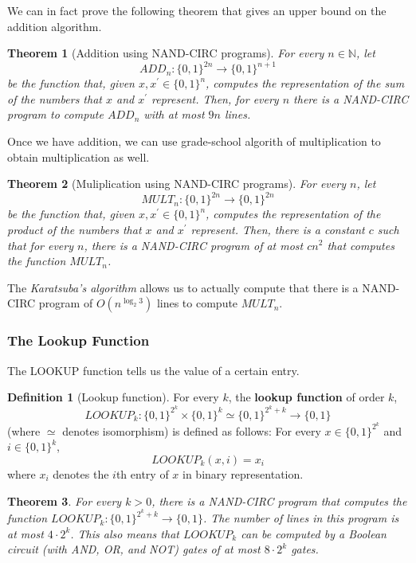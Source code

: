 \documentclass[a4paper, 12pt]{report}
\newtheorem{theorem}{Theorem}[section]
\theoremstyle{remark}
\theoremstyle{definition}
\newtheorem{definition}{Definition}[section]
\begin{document}
We can in fact prove the following theorem that gives an upper bound on the addition algorithm. 

\begin{theorem}[Addition using NAND-CIRC programs]
For every $n \in \mathbb{N}$, let 
\[ADD_n : \{0,1\}^{2n} \longrightarrow \{0,1\}^{n+1}\]
be the function that, given $x, x^\prime \in \{0,1\}^n$, computes the representation of the sum of the numbers that $x$ and $x^\prime$ represent. Then, for every $n$ there is a NAND-CIRC program to compute $ADD_n$ with at most $9n$ lines. 
\end{theorem}

Once we have addition, we can use grade-school algorith of multiplication to obtain multiplication as well. 

\begin{theorem}[Muliplication using NAND-CIRC programs]
For every $n$, let 
\[MULT_n : \{0,1\}^{2n} \longrightarrow \{0,1\}^{2n}\]
be the function that, given $x, x^\prime \in \{0,1\}^n$, computes the representation of the product of the numbers that $x$ and $x^\prime$ represent. Then, there is a constant $c$ such that for every $n$, there is a NAND-CIRC program of at most $cn^2$ that computes the function $MULT_n$. 
\end{theorem}

The \textit{Karatsuba's algorithm} allows us to actually compute that there is a NAND-CIRC program of $O(n^{\log_2 3})$ lines to compute $MULT_n$. 

\subsubsection{The Lookup Function}
The LOOKUP function tells us the value of a certain entry. 
\begin{definition}[Lookup function]
For every $k$, the \textbf{lookup function} of order $k$, 
\[LOOKUP_k: \{0,1\}^{2^k} \times \{0,1\}^k \simeq \{0,1\}^{2^k + k} \longrightarrow \{0,1\}\]
(where $\simeq$ denotes isomorphism) is defined as follows: For every $x \in \{0,1\}^{2^k}$ and $i \in \{0,1\}^k$, 
\[LOOKUP_k (x, i) = x_i\]
where $x_i$ denotes the $i$th entry of $x$ in binary representation. 
\end{definition}

\begin{theorem}
For every $k > 0$, there is a NAND-CIRC program that computes the function $LOOKUP_k: \{0,1\}^{2^k + k} \longrightarrow \{0,1\}$. The number of lines in this program is at most $4 \cdot 2^k$. This also means that $LOOKUP_k$ can be computed by a Boolean circuit (with AND, OR, and NOT) gates of at most $8 \cdot 2^k$ gates. 
\end{theorem}
\end{document}
